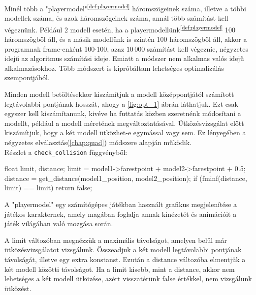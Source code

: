 
Minél több a "playermodel"\textsuperscript{\ref{def:playermodel}} háromszögeinek száma, illetve a többi modellek száma, és azok háromszögeinek száma, annál több számítást kell végeznünk. Például 2 modell esetén, ha a playermodellünk\textsuperscript{\ref{def:playermodel}} 100 háromszögből áll, és a másik modellünk is szintén 100 háromszögből áll, akkor a programnak frame-enként 100$\cdot$100, azaz $10\,000$ számítást kell végeznie, négyzetes idejű az algoritmus számítási ideje. Emiatt a módszer nem alkalmas valós idejű alkalmazásokhoz. Több módszert is kipróbáltam lehetséges optimalizálás szempontjából.

Minden modell betöltésekkor kiszámítjuk a modell középpontjától számított legtávolabbi pontjának hosszát, ahogy a \ref{fig:opt_1} ábrán láthatjuk. Ezt csak egyszer kell kiszámítanunk, kivéve ha futtatás közben szeretnénk módosítani a modellt, például a modell méretének megváltoztatásával. Ütközésvizsgálat előtt kiszámítjuk, hogy a két modell ütközhet-e egymással vagy sem. Ez lényegében a négyzetes elválasztás(\ref{chap:quad}) módszere alapján működik.
\\
Részlet a \texttt{check\_collision} függvényből:
\begin{cpp}
float limit, distance;
limit = model1->farestpoint + model2->farestpoint + 0.5;
distance = get_distance(model1_position, model2_position);
if (fminf(distance, limit) == limit)
{
    return false;
}
\end{cpp}

\vfill
\begin{definition}[Playermodel]
	A "playermodel" egy számítógépes játékban használt grafikus megjelenítése a játékos karakternek, amely magában foglalja annak kinézetét és animációit a játék világában való mozgása során.
	\label{def:playermodel}
\end{definition}
\newpage
A limit változóban megnézzük a maximális távolságot, amelyen belül már ütközésvizsgálatot vizsgálunk. Összeadjuk a két modell legtávolabbi pontjának távolságát, illetve egy extra konstanst. Ezután a distance változóba elmentjük a két modell közötti távolságot. Ha a limit kisebb, mint a distance, akkor nem lehetséges a két modell ütközése, azért visszatérünk false értékkel, nem vizsgálunk ütközést.

